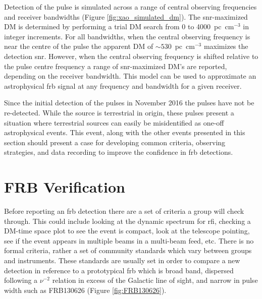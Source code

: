 \documentclass[a4paper,fleqn,usenatbib]{mnras}
\begin{document}
Detection of the pulse is simulated across a range of central observing
frequencies and receiver bandwidths (Figure \ref{fig:xao_simulated_dm}). The
\gls{snr}-maximized DM is determined by performing a trial DM search from 0 to
4000~pc~cm$^{-3}$ in integer increments.  For all bandwidths, when the central
observing frequency is near the centre of the pulse the apparent DM of
$\sim530$~pc~cm$^{-3}$ maximizes the detection \gls{snr}. However, when the
central observing frequency is shifted relative to the pulse centre frequency a
range of \gls{snr}-maximized DM's are reported, depending on the receiver
bandwidth. This model can be used to approximate an astrophysical \gls{frb}
signal at any frequency and bandwidth for a given receiver.

Since the initial detection of the pulses in November 2016 the pulses have not
be re-detected. While the source is terrestrial in origin, these pulses present a
situation where terrestrial sources can easily be misidentified as one-off
astrophysical events. This event, along with the other events presented in this
section should present a case for developing common criteria, observing
strategies, and data recording to improve the confidence in \gls{frb}
detections.

\section{FRB Verification}
\label{sec:verify_crit}

Before reporting an \gls{frb} detection there are a set of criteria a group will
check through. This could include looking at the dynamic spectrum for \gls{rfi},
checking a DM-time space plot to see the event is compact, look at the telescope
pointing, see if the event appears in multiple beams in a multi-beam feed, etc.
There is no formal criteria, rather a set of community standards which vary
between groups and instruments. These standards are usually set in order to
compare a new detection in reference to a prototypical \gls{frb} which is broad
band, dispersed following a $\nu^{-2}$ relation in excess of the Galactic line
of sight, and narrow in pulse width such as FRB130626
\citep{2016MNRAS.460L..30C} (Figure \ref{fig:FRB130626}).
\end{document}
